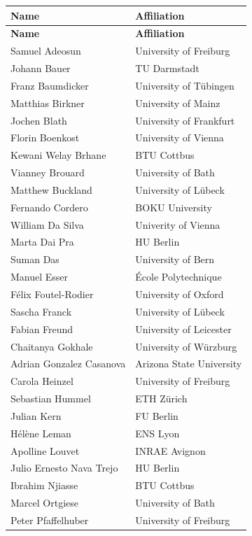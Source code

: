 \documentclass[12pt,a4paper]{article}
\begin{document}
\begin{longtable}{L{0.3\textwidth}R{0.7\textwidth}}
\hline
\textbf{Name} & \textbf{Affiliation} \\
\hline
\endfirsthead

\hline
\textbf{Name} & \textbf{Affiliation} \\
\hline
\endhead

Samuel Adeosun & University of Freiburg \\
Johann Bauer & TU Darmstadt \\
Franz Baumdicker & University of Tübingen \\
Matthias Birkner & University of Mainz \\
Jochen Blath & University of Frankfurt \\
Florin Boenkost & University of Vienna \\
Kewani Welay Brhane & BTU Cottbus \\
Vianney Brouard & University of Bath \\
Matthew Buckland & University of Lübeck \\
Fernando Cordero & BOKU University \\
William Da Silva & Univerity of Vienna \\
Marta Dai Pra & HU Berlin \\
Suman Das & University of Bern \\
Manuel Esser & École Polytechnique \\
Félix Foutel-Rodier & University of Oxford \\
Sascha Franck & University of Lübeck \\
Fabian Freund & University of Leicester \\
Chaitanya Gokhale & University of Würzburg \\
Adrian Gonzalez Casanova & Arizona State University \\
Carola Heinzel & University of Freiburg \\
Sebastian Hummel & ETH Zürich \\
Julian Kern & FU Berlin \\
Hélène Leman & ENS Lyon \\
Apolline Louvet & INRAE Avignon \\
Julio Ernesto Nava Trejo & HU Berlin \\
Ibrahim Njiasse & BTU Cottbus \\
Marcel Ortgiese & University of Bath \\
Peter Pfaffelhuber & University of Freiburg \\

\end{longtable}
\end{document}
